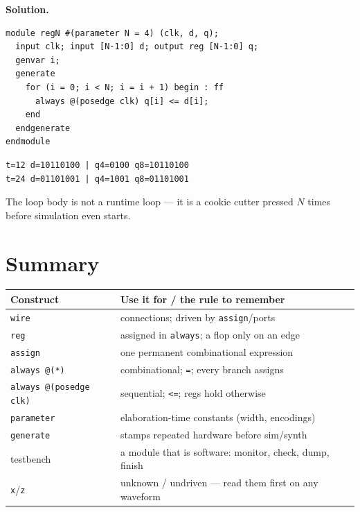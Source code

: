 \textbf{Solution.}
\begin{lstlisting}[caption={\ttfamily code/ch11\_gen.v --- the
generate loop stamps out N posedge always blocks.},label={lst:gen}]
module regN #(parameter N = 4) (clk, d, q);
  input clk; input [N-1:0] d; output reg [N-1:0] q;
  genvar i;
  generate
    for (i = 0; i < N; i = i + 1) begin : ff
      always @(posedge clk) q[i] <= d[i];
    end
  endgenerate
endmodule
\end{lstlisting}

\begin{lstlisting}[caption={Real run --- \texttt{q4} tracks
\texttt{d[3:0]}, \texttt{q8} the full byte, each through its own
generated flops.},abovecaptionskip=0pt]
t=12 d=10110100 | q4=0100 q8=10110100
t=24 d=01101001 | q4=1001 q8=01101001
\end{lstlisting}

The loop body is not a runtime loop --- it is a cookie cutter pressed
$N$ times before simulation even starts.

\section{Summary}

\begin{center}
\begin{tabularx}{\textwidth}{l>{\raggedright\arraybackslash}X}
\toprule
\textbf{Construct} & \textbf{Use it for / the rule to remember}\\
\midrule
\texttt{wire} & connections; driven by \texttt{assign}/ports\\
\texttt{reg} & assigned in \texttt{always}; a flop only on an edge\\
\texttt{assign} & one permanent combinational expression\\
\texttt{always @(*)} & combinational; \texttt{=}; every branch assigns\\
\texttt{always @(posedge clk)} & sequential; \texttt{<=}; regs hold
otherwise\\
\texttt{parameter} & elaboration-time constants (width, encodings)\\
\texttt{generate} & stamps repeated hardware before sim/synth\\
testbench & a module that is software: monitor, check, dump, finish\\
\texttt{x}/\texttt{z} & unknown / undriven --- read them first on any
waveform\\
\bottomrule
\end{tabularx}
\end{center}

